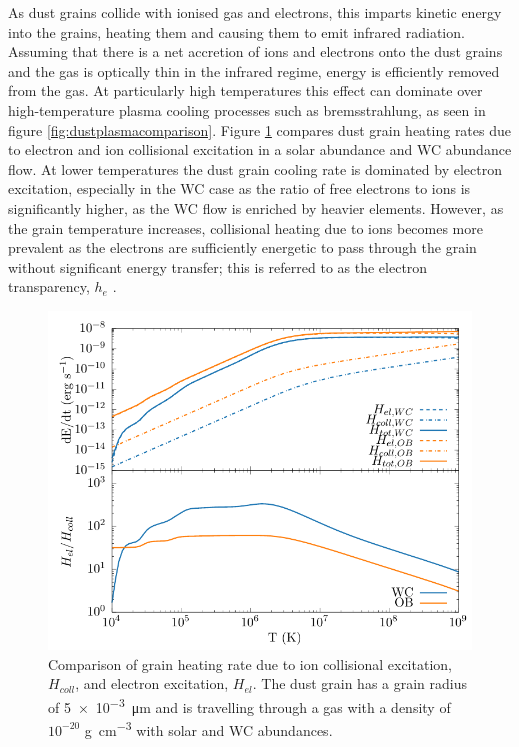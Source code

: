 As dust grains collide with ionised gas and electrons, this imparts kinetic energy into the grains, heating them and causing them to emit infrared radiation. Assuming that there is a net accretion of ions and electrons onto the dust grains and the gas is optically thin in the infrared regime, energy is efficiently removed from the gas.
At particularly high temperatures this effect can dominate over high-temperature plasma cooling processes such as bremsstrahlung, as seen in figure \ref{fig:dustplasmacomparison}.
Figure \ref{fig:collisionalheatingcomparison} compares dust grain heating rates due to electron and ion collisional excitation in a solar abundance and WC abundance flow.
At lower temperatures the dust grain cooling rate is dominated by electron excitation, especially in the WC case as the ratio of free electrons to ions is significantly higher, as the WC flow is enriched by heavier elements.
However, as the grain temperature increases, collisional heating due to ions becomes more prevalent as the electrons are sufficiently energetic to pass through the grain without significant energy transfer; this is referred to as the electron transparency, $h_e$ \parencite{dwek_infrared_1981}.

\begin{figure}[h]
  \centering
  \includegraphics{assets/dust-electron-contribution/coll-el-comp.pdf}
  \caption[$H_{el}$ and $H_{coll}$ comparison]{Comparison of grain heating rate due to ion collisional excitation, $H_{coll}$, and electron excitation, $H_{el}$. The dust grain has a grain radius of \SI{5e-3}{\micro\metre} and is travelling through a gas with a density of $10^{-20}$ \si{\gram\per\centi\metre\cubed} with solar and WC abundances.}
  \label{fig:collisionalheatingcomparison}
\end{figure}


